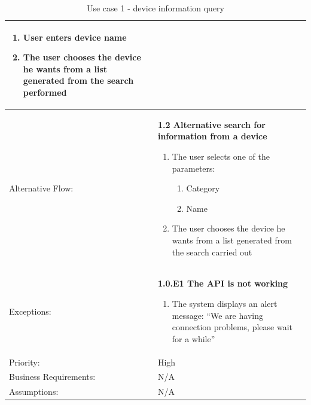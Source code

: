\begin{table}[H]
\begin{adjustbox}{width=1.2\textwidth,center=\textwidth}
\begin{tabular}{|m{4cm}|m{12cm}|}
            \begin{enumerate}
                \item User enters device name
                \item The user chooses the device he wants from a list generated from the search performed
            \end{enumerate} \\
            \hline
            Alternative Flow: & \textbf{1.2 Alternative search for information from a device}
            \begin{enumerate}
                \item The user selects one of the parameters:
                \begin{enumerate}
                    \item Category
                    \item Name
                \end{enumerate}
                \item The user chooses the device he wants from a list generated from the search carried out
            \end{enumerate} \\
            \hline
            Exceptions: & \textbf{1.0.E1  The API is not working}
            \begin{enumerate}
                \item The system displays an alert message: ``We are having connection problems, please wait for a while''
            \end{enumerate} \\
            \hline
            Priority: & High \\
            \hline
            Business Requirements: & N/A \\
            \hline
            Assumptions: & N/A \\
            \hline
        \end{tabular}
    \end{adjustbox}
    \vspace{1em}
    \caption{Use case 1 - device information query}
    \label{use case 1}
\end{table}

